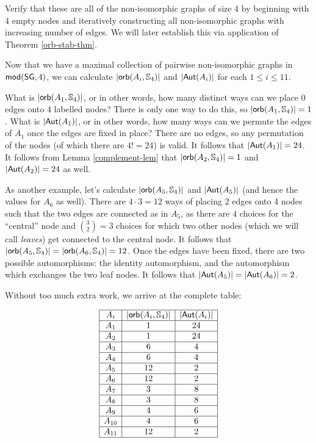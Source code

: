 \begin{aside}
    Verify that these are all of the non-isomorphic graphs of size 4 by beginning with 4 empty nodes and iteratively constructing all non-isomorphic graphs with increasing number of edges. We will later establish this via application of Theorem \ref{orb-stab-thm}.
\end{aside}

Now that we have a maximal collection of pairwise non-isomorphic graphs in $\mbox{$\mathsf{mod}(\mbox{$\mathsf{SG}$},4)$}$, we can calculate $\mbox{$|\mbox{$\mathsf{orb}(A_i,\mbox{$\mathbb{S}_{4}$})$}|$}$ and $\mbox{$|\mbox{$\mathsf{Aut}(A_i)$}|$}$ for each $1\leq i\leq 11$. 

What is $\mbox{$|\mbox{$\mathsf{orb}(A_1,\mbox{$\mathbb{S}_{4}$})$}|$}$, or in other words, how many distinct ways can we place 0 edges onto 4 labelled nodes? There is only one way to do this, so $\mbox{$|\mbox{$\mathsf{orb}(A_1,\mbox{$\mathbb{S}_{4}$})$}|$} = 1$. What is $\mbox{$|\mbox{$\mathsf{Aut}(A_1)$}|$}$, or in other words, how many ways can we permute the edges of $A_1$ once the edges are fixed in place? There are no edges, so any permutation of the nodes (of which there are $4! = 24$) is valid. It follows that $\mbox{$|\mbox{$\mathsf{Aut}(A_1)$}|$} = 24$. It follows from Lemma \ref{complement-lem} that $\mbox{$|\mbox{$\mathsf{orb}(A_2,\mbox{$\mathbb{S}_{4}$})$}|$} = 1$ and $\mbox{$|\mbox{$\mathsf{Aut}(A_2)$}|$} = 24$ as well. 

As another example, let's calculate $\mbox{$|\mbox{$\mathsf{orb}(A_5,\mbox{$\mathbb{S}_{4}$})$}|$}$ and $\mbox{$|\mbox{$\mathsf{Aut}(A_5)$}|$}$ (and hence the values for $A_6$ as well). There are $4 \cdot 3 = 12$ ways of placing 2 edges onto 4 nodes such that the two edges are connected as in $A_5$, as there are $4$ choices for the ``central'' node and $\binom{3}{2} = 3$ choices for which two other nodes (which we will call \emph{leaves}) get connected to the central node. It follows that $\mbox{$|\mbox{$\mathsf{orb}(A_5,\mbox{$\mathbb{S}_{4}$})$}|$} = \mbox{$|\mbox{$\mathsf{orb}(A_6,\mbox{$\mathbb{S}_{4}$})$}|$} = 12$. Once the edges have been fixed, there are two possible automorphisms: the identity automorphism, and the automorphism which exchanges the two leaf nodes. It follows that $\mbox{$|\mbox{$\mathsf{Aut}(A_5)$}|$} = \mbox{$|\mbox{$\mathsf{Aut}(A_6)$}|$} = 2$. 

Without too much extra work, we arrive at the complete table:

\[
\begin{array}{|c|c|c|}
\hline
A_i  & \mbox{$|\mbox{$\mathsf{orb}(A_i,\mbox{$\mathbb{S}_{4}$})$}|$} & \mbox{$|\mbox{$\mathsf{Aut}(A_i)$}|$}\\
\hline
A_1 & 1 & 24\\
\hline
A_2 & 1 & 24 \\
\hline
A_3 & 6 & 4\\
\hline
A_4 & 6 & 4\\
\hline
A_5 & 12 & 2\\
\hline
A_6 & 12 & 2\\
\hline
A_7 & 3 & 8 \\
\hline
A_8 & 3 & 8 \\
\hline
A_9 & 4 & 6 \\
\hline
A_{10} & 4 & 6 \\
\hline
A_{11} & 12 & 2\\
\hline
\end{array}
\]

